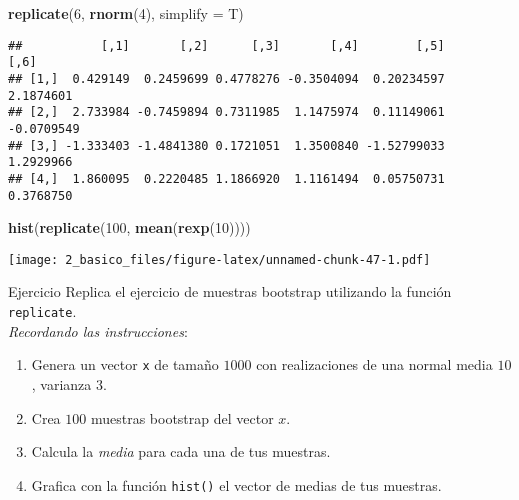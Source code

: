 \documentclass[]{article}
\newenvironment{Shaded}{\begin{snugshade}}{\end{snugshade}}
\newcommand{\KeywordTok}[1]{\textcolor[rgb]{0.13,0.29,0.53}{\textbf{#1}}}
\newcommand{\DataTypeTok}[1]{\textcolor[rgb]{0.13,0.29,0.53}{#1}}
\newcommand{\DecValTok}[1]{\textcolor[rgb]{0.00,0.00,0.81}{#1}}
\newcommand{\NormalTok}[1]{#1}
\begin{document}
\begin{Shaded}
\begin{Highlighting}[]
\KeywordTok{replicate}\NormalTok{(}\DecValTok{6}\NormalTok{, }\KeywordTok{rnorm}\NormalTok{(}\DecValTok{4}\NormalTok{), }\DataTypeTok{simplify =}\NormalTok{ T)}
\end{Highlighting}
\end{Shaded}

\begin{verbatim}
##           [,1]       [,2]      [,3]       [,4]        [,5]       [,6]
## [1,]  0.429149  0.2459699 0.4778276 -0.3504094  0.20234597  2.1874601
## [2,]  2.733984 -0.7459894 0.7311985  1.1475974  0.11149061 -0.0709549
## [3,] -1.333403 -1.4841380 0.1721051  1.3500840 -1.52799033  1.2929966
## [4,]  1.860095  0.2220485 1.1866920  1.1161494  0.05750731  0.3768750
\end{verbatim}

\begin{Shaded}
\begin{Highlighting}[]
\KeywordTok{hist}\NormalTok{(}\KeywordTok{replicate}\NormalTok{(}\DecValTok{100}\NormalTok{, }\KeywordTok{mean}\NormalTok{(}\KeywordTok{rexp}\NormalTok{(}\DecValTok{10}\NormalTok{))))}
\end{Highlighting}
\end{Shaded}

\texttt{[image: 2\_basico\_files/figure-latex/unnamed-chunk-47-1.pdf]}

\renewcommand\bcStyleTitre[1]{\large\textcolor{bbblack}{#1}}

\begin{bclogo}[
  couleur=llred,
  arrondi=0,
  logo=\bcstop,
  barre=none,
  noborder=true]{Ejercicio}
Replica el ejercicio de muestras bootstrap utilizando la función \texttt{replicate}.\\

\textit{Recordando las instrucciones}:

\begin{enumerate}
\item Genera un vector \texttt{x} de tamaño $1000$ con realizaciones de una normal media $10$, varianza $3$. 
\item Crea $100$ muestras bootstrap del vector $x$.
\item Calcula la \textit{media} para cada una de tus muestras.
\item Grafica con la función \texttt{hist()} el vector de medias de tus muestras.
\end{enumerate}

\end{bclogo}
\end{document}
